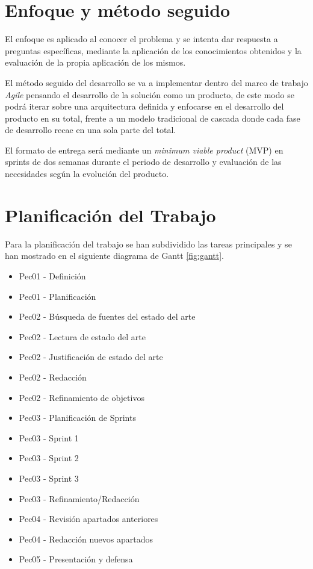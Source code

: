 \section{Enfoque y método seguido}
El enfoque es aplicado al conocer el problema y se intenta dar respuesta a preguntas específicas, mediante la aplicación de los conocimientos obtenidos y la evaluación de la propia aplicación de los mismos.  \par

\vspace{0.5cm}

El método seguido del desarrollo se va a implementar dentro del marco de trabajo \textit{Agile} pensando el desarrollo de la solución como un producto, de este modo se podrá iterar sobre una arquitectura definida y enfocarse en el desarrollo del producto en su total, frente a un modelo tradicional de cascada donde cada fase de desarrollo recae en una sola parte del total.

\vspace{0.5cm}

El formato de entrega será mediante un \textit{minimum viable product} (MVP) en sprints de dos semanas durante el periodo de desarrollo y evaluación de las necesidades según la evolución del producto.

\section{Planificación del Trabajo}

Para la planificación del trabajo se han subdividido las tareas principales y se han mostrado en el siguiente diagrama de Gantt \ref{fig:gantt}.

\begin{itemize}
    \item Pec01 - Definición
    \item Pec01 - Planificación
    \item Pec02 - Búsqueda de fuentes del estado del arte
    \item Pec02 - Lectura de estado del arte
    \item Pec02 - Justificación de estado del arte
    \item Pec02 - Redacción
    \item Pec02 - Refinamiento de objetivos
    \item Pec03 - Planificación de Sprints
    \item Pec03 - Sprint 1
    \item Pec03 - Sprint 2
    \item Pec03 - Sprint 3
    \item Pec03 - Refinamiento/Redacción
    \item Pec04 - Revisión apartados anteriores
    \item Pec04 - Redacción nuevos apartados
    \item Pec05 - Presentación y defensa
\end{itemize}



